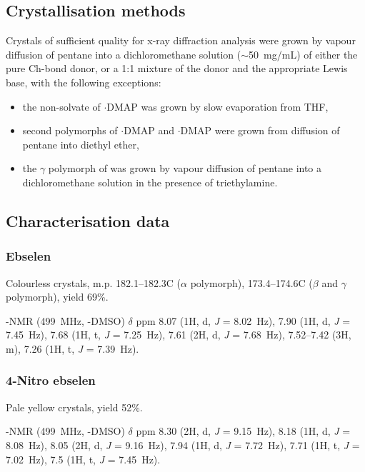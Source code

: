 \begin{refsection}
\subsection{Crystallisation methods}
Crystals of sufficient quality for x-ray diffraction analysis were grown by vapour diffusion of pentane into a dichloromethane solution ($\sim$50~mg/mL) of either the pure Ch-bond donor, or a 1:1 mixture of the donor and the appropriate Lewis base, with the following exceptions:
\begin{itemize}
    \item the non-solvate of $ \cdot $DMAP was grown by slow evaporation from THF,
    \item second polymorphs of $ \cdot $DMAP and $ \cdot $DMAP were grown from diffusion of pentane into diethyl ether,
    \item the $\gamma$ polymorph of  was grown by vapour diffusion of pentane into a dichloro\-methane solution in the presence of triethylamine.
\end{itemize}

\subsection{Characterisation data}

\subsubsection{Ebselen }
Colourless crystals, m.p. 182.1--182.3\degree{}C ($\alpha$ polymorph), 173.4--174.6\degree{}C ($\beta$ and $\gamma$ polymorph), yield 69\%.

-NMR (499~MHz, -DMSO) $ \delta $ ppm 8.07 (1H, d, \textit{J} = 8.02~Hz), 7.90 (1H, d, \textit{J} = 7.45~Hz), 7.68 (1H, t, \textit{J} = 7.25~Hz), 7.61 (2H, d, \textit{J} = 7.68~Hz), 7.52--7.42 (3H, m), 7.26 (1H, t, \textit{J} = 7.39~Hz).

\subsubsection{4-Nitro ebselen }
Pale yellow crystals, yield 52\%.

-NMR (499~MHz, -DMSO) $ \delta $ ppm 8.30 (2H, d, \textit{J} = 9.15~Hz), 8.18 (1H, d, \textit{J} = 8.08~Hz), 8.05 (2H, d, \textit{J} = 9.16~Hz), 7.94 (1H, d, \textit{J} = 7.72~Hz), 7.71 (1H, t, \textit{J} = 7.02~Hz), 7.5 (1H, t, \textit{J} = 7.45~Hz).


\end{refsection}
